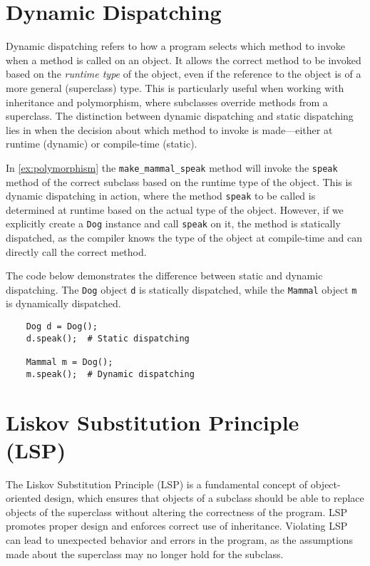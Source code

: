 \documentclass[oneside,11pt,dvipsnames]{book}
\newcommand{\code}[1]{\texttt{#1}}
\begin{document}
\section{Dynamic Dispatching}

Dynamic dispatching refers to how a program selects which method to invoke when a method is called on an object.  It allows the correct method to be invoked based on the \emph{runtime type} of the object, even if the reference to the object is of a more general (superclass) type. This is particularly useful when working with inheritance and polymorphism, where subclasses override methods from a superclass.
The distinction between dynamic dispatching and static dispatching lies in when the decision about which method to invoke is made—either at runtime (dynamic) or compile-time (static).

In \autoref{ex:polymorphism} the \code{make\_mammal\_speak} method will invoke the \code{speak} method of the correct subclass based on the runtime type of the object. This is dynamic dispatching in action, where the method \code{speak} to be called is determined at runtime based on the actual type of the object.  However, if we explicitly create a \code{Dog} instance and call \code{speak} on it, the method is statically dispatched, as the compiler knows the type of the object at compile-time and can directly call the correct method.

The code below demonstrates the difference between static and dynamic dispatching. The \code{Dog} object \code{d} is statically dispatched, while the \code{Mammal} object \code{m} is dynamically dispatched.
\begin{lstlisting}
    Dog d = Dog();
    d.speak();  # Static dispatching

    Mammal m = Dog();
    m.speak();  # Dynamic dispatching
\end{lstlisting}    

\section{Liskov Substitution Principle (LSP)}
The Liskov Substitution Principle (LSP) is a fundamental concept of object-oriented design, which ensures that objects of a subclass should be able to replace objects of the superclass without altering the correctness of the program. LSP promotes proper design and enforces correct use of inheritance.
Violating LSP can lead to unexpected behavior and errors in the program, as the assumptions made about the superclass may no longer hold for the subclass. 
\end{document}
